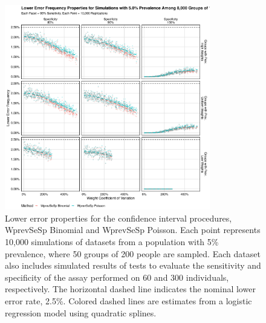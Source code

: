 \begin{figure}
\centering
\includegraphics[width=0.8\textwidth]{imperfect_lower_error_frequency_8000_groups_0_05_prev}
\caption{Lower error properties for the confidence interval procedures, WprevSeSp Binomial and WprevSeSp Poisson.
Each point represents 10,000 simulations of datasets from a population with 5\% prevalence, where 50 groups of 200 people are sampled.
Each dataset also includes simulated results of tests to evaluate the sensitivity and specificity of the assay performed on 60 and 300 individuals, respectively.
The horizontal dashed line indicates the nominal lower error rate, 2.5\%.
Colored dashed lines are estimates from a logistic regression model using quadratic splines.}
\label{ch_3:fig:imperfect_lower_error_frequency_8000_groups_0_05_prev}
\end{figure}

